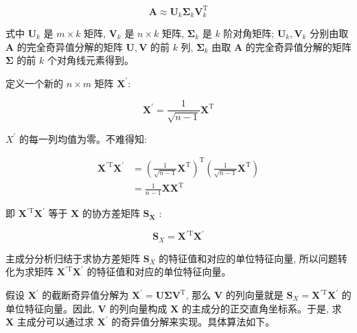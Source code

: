 \documentclass[10pt]{article}
\begin{document}
$$
\boldsymbol{A} \approx \boldsymbol{U}_{k} \boldsymbol{\Sigma}_{k} \boldsymbol{V}_{k}^{\mathrm{T}}
$$

式中 $\boldsymbol{U}_{k}$ 是 $m \times k$ 矩阵, $\boldsymbol{V}_{k}$ 是 $n \times k$ 矩阵, $\boldsymbol{\Sigma}_{k}$ 是 $k$ 阶对角矩阵; $\boldsymbol{U}_{k}, \boldsymbol{V}_{k}$ 分别由取 $\boldsymbol{A}$ 的完全奇异值分解的矩阵 $\boldsymbol{U}, \boldsymbol{V}$ 的前 $k$ 列, $\boldsymbol{\Sigma}_{k}$ 由取 $\boldsymbol{A}$ 的完全奇异值分解的矩阵 $\boldsymbol{\Sigma}$ 的前 $k$ 个对角线元素得到。

定义一个新的 $n \times m$ 矩阵 $\boldsymbol{X}^{\prime}:$


\begin{equation*}
\boldsymbol{X}^{\prime}=\frac{1}{\sqrt{n-1}} \boldsymbol{X}^{\mathrm{T}} \tag{16.51}
\end{equation*}


$X^{\prime}$ 的每一列均值为零。不难得知:


\begin{align*}
\boldsymbol{X}^{\prime \mathrm{T}} \boldsymbol{X}^{\prime} & =\left(\frac{1}{\sqrt{n-1}} \boldsymbol{X}^{\mathrm{T}}\right)^{\mathrm{T}}\left(\frac{1}{\sqrt{n-1}} \boldsymbol{X}^{\mathrm{T}}\right) \\
& =\frac{1}{n-1} \boldsymbol{X} \boldsymbol{X}^{\mathrm{T}} \tag{16.52}
\end{align*}


即 $\boldsymbol{X}^{\prime \mathrm{T}} \boldsymbol{X}^{\prime}$ 等于 $\boldsymbol{X}$ 的协方差矩阵 $\boldsymbol{S}_{\boldsymbol{X}}$ :


\begin{equation*}
\boldsymbol{S}_{X}=\boldsymbol{X}^{\prime \mathrm{T}} \boldsymbol{X}^{\prime} \tag{16.53}
\end{equation*}


主成分分析归结于求协方差矩阵 $\boldsymbol{S}_{X}$ 的特征值和对应的单位特征向量, 所以问题转化为求矩阵 $\boldsymbol{X}^{\prime \mathrm{T}} \boldsymbol{X}^{\prime}$ 的特征值和对应的单位特征向量。

假设 $\boldsymbol{X}^{\prime}$ 的截断奇异值分解为 $\boldsymbol{X}^{\prime}=\boldsymbol{U} \boldsymbol{\Sigma} \boldsymbol{V}^{\mathrm{T}}$, 那么 $\boldsymbol{V}$ 的列向量就是 $\boldsymbol{S}_{X}=\boldsymbol{X}^{\prime \mathrm{T}} \boldsymbol{X}^{\prime}$ 的单位特征向量。因此, $\boldsymbol{V}$ 的列向量构成 $\boldsymbol{X}$ 的主成分的正交直角坐标系。于是, 求 $\boldsymbol{X}$ 主成分可以通过求 $\boldsymbol{X}^{\prime}$ 的奇异值分解来实现。具体算法如下。
\end{document}
